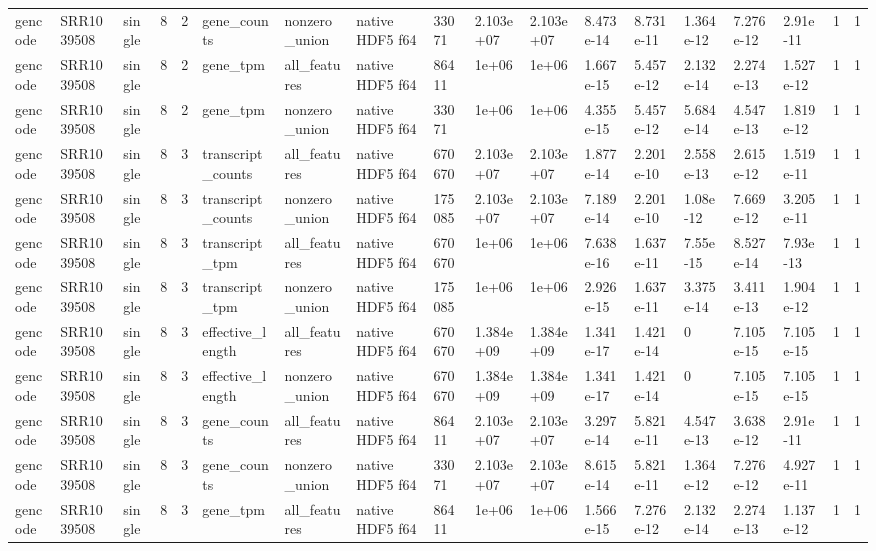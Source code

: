 \begin{tabular}{llllllllllllllllll}
gencode & SRR1039508 & single & 8 & 2 & gene\_counts & nonzero\_union & native HDF5 f64 & 33071 & 2.103e+07 & 2.103e+07 & 8.473e-14 & 8.731e-11 & 1.364e-12 & 7.276e-12 & 2.91e-11 & 1 & 1 \\
gencode & SRR1039508 & single & 8 & 2 & gene\_tpm & all\_features & native HDF5 f64 & 86411 & 1e+06 & 1e+06 & 1.667e-15 & 5.457e-12 & 2.132e-14 & 2.274e-13 & 1.527e-12 & 1 & 1 \\
gencode & SRR1039508 & single & 8 & 2 & gene\_tpm & nonzero\_union & native HDF5 f64 & 33071 & 1e+06 & 1e+06 & 4.355e-15 & 5.457e-12 & 5.684e-14 & 4.547e-13 & 1.819e-12 & 1 & 1 \\
gencode & SRR1039508 & single & 8 & 3 & transcript\_counts & all\_features & native HDF5 f64 & 670670 & 2.103e+07 & 2.103e+07 & 1.877e-14 & 2.201e-10 & 2.558e-13 & 2.615e-12 & 1.519e-11 & 1 & 1 \\
gencode & SRR1039508 & single & 8 & 3 & transcript\_counts & nonzero\_union & native HDF5 f64 & 175085 & 2.103e+07 & 2.103e+07 & 7.189e-14 & 2.201e-10 & 1.08e-12 & 7.669e-12 & 3.205e-11 & 1 & 1 \\
gencode & SRR1039508 & single & 8 & 3 & transcript\_tpm & all\_features & native HDF5 f64 & 670670 & 1e+06 & 1e+06 & 7.638e-16 & 1.637e-11 & 7.55e-15 & 8.527e-14 & 7.93e-13 & 1 & 1 \\
gencode & SRR1039508 & single & 8 & 3 & transcript\_tpm & nonzero\_union & native HDF5 f64 & 175085 & 1e+06 & 1e+06 & 2.926e-15 & 1.637e-11 & 3.375e-14 & 3.411e-13 & 1.904e-12 & 1 & 1 \\
gencode & SRR1039508 & single & 8 & 3 & effective\_length & all\_features & native HDF5 f64 & 670670 & 1.384e+09 & 1.384e+09 & 1.341e-17 & 1.421e-14 & 0 & 7.105e-15 & 7.105e-15 & 1 & 1 \\
gencode & SRR1039508 & single & 8 & 3 & effective\_length & nonzero\_union & native HDF5 f64 & 670670 & 1.384e+09 & 1.384e+09 & 1.341e-17 & 1.421e-14 & 0 & 7.105e-15 & 7.105e-15 & 1 & 1 \\
gencode & SRR1039508 & single & 8 & 3 & gene\_counts & all\_features & native HDF5 f64 & 86411 & 2.103e+07 & 2.103e+07 & 3.297e-14 & 5.821e-11 & 4.547e-13 & 3.638e-12 & 2.91e-11 & 1 & 1 \\
gencode & SRR1039508 & single & 8 & 3 & gene\_counts & nonzero\_union & native HDF5 f64 & 33071 & 2.103e+07 & 2.103e+07 & 8.615e-14 & 5.821e-11 & 1.364e-12 & 7.276e-12 & 4.927e-11 & 1 & 1 \\
gencode & SRR1039508 & single & 8 & 3 & gene\_tpm & all\_features & native HDF5 f64 & 86411 & 1e+06 & 1e+06 & 1.566e-15 & 7.276e-12 & 2.132e-14 & 2.274e-13 & 1.137e-12 & 1 & 1 \\

\end{tabular}
